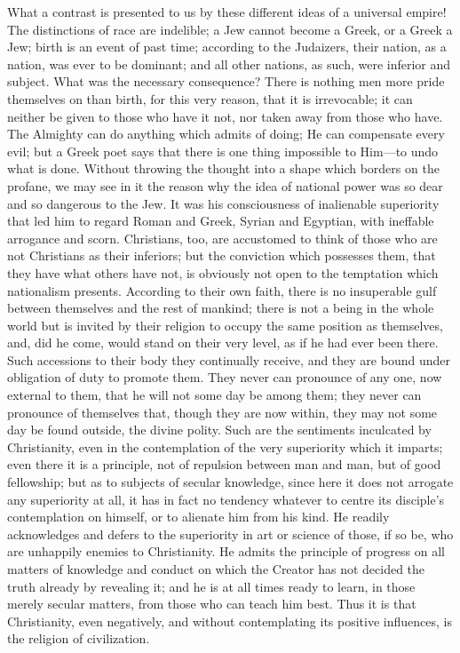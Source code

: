 What a contrast is presented
to us by these different ideas of a universal empire! The distinctions
of race are indelible; a Jew cannot become a Greek, or a Greek a Jew;
birth is an event of past time; according to the Judaizers, their
nation, as a nation, was ever to be dominant; and all other nations,
as such, were inferior and subject. What was the necessary
consequence? There is nothing men more pride themselves on than birth,
for this very reason, that it is irrevocable; it can neither be given
to those who have it not, nor taken away from those who have. The
Almighty can do anything which admits of doing; He can compensate
every evil; but a Greek poet says that there is one thing impossible
to Him—to undo what is done. Without throwing the thought into a
shape which borders on the profane, we may see in it the reason why
the idea of national power was so dear and so dangerous to the Jew. It
was his consciousness of inalienable superiority that led him to
regard Roman and Greek, Syrian and Egyptian, with ineffable
arrogance and scorn. Christians, too, are accustomed to think of those
who are not Christians as their inferiors; but the conviction which
possesses them, that they have what others have not, is obviously not
open to the temptation which nationalism presents. According to their
own faith, there is no insuperable gulf between themselves and the
rest of mankind; there is not a being in the whole world but is
invited by their religion to occupy the same position as themselves,
and, did he come, would stand on their very level, as if he had ever
been there. Such accessions to their body they continually receive,
and they are bound under obligation of duty to promote them. They
never can pronounce of any one, now external to them, that he will not
some day be among them; they never can pronounce of themselves that,
though they are now within, they may not some day be found outside,
the divine polity. Such are the sentiments inculcated by Christianity,
even in the contemplation of the very superiority which it imparts;
even there it is a principle, not of repulsion between man and man,
but of good fellowship; but as to subjects of secular knowledge, since
here it does not arrogate any superiority at all, it has in fact no
tendency whatever to centre its disciple's contemplation on himself,
or to alienate him from his kind. He readily acknowledges and defers
to the superiority in art or science of those, if so be, who are
unhappily enemies to Christianity. He admits the principle of progress
on all matters of knowledge and conduct on which the Creator has not
decided the truth already by revealing it; and he is at all times
ready to learn, in those merely secular matters, from those who can
teach him best. Thus it is that Christianity, even negatively, and
without contemplating its positive influences, is the religion of
civilization.

